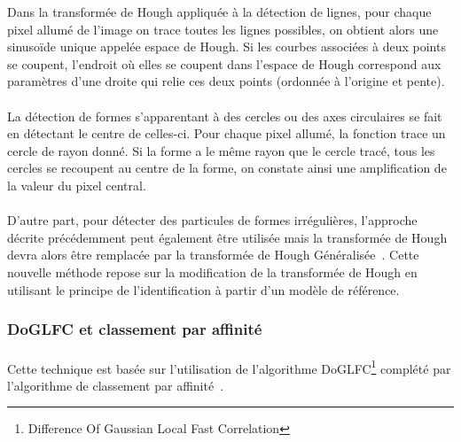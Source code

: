 \documentclass[11pt,a4paper]{report}
\begin{document}
\noindent
Dans la transformée de Hough\cite{HT:url} appliquée à la détection de lignes, pour chaque pixel allumé de l'image on trace toutes les lignes possibles, on obtient alors une sinusoïde unique appelée espace de Hough. Si les courbes associées à deux points se coupent, l'endroit où elles se coupent dans l'espace de Hough correspond aux paramètres d'une droite qui relie ces deux points (ordonnée à l'origine et pente).%

\paragraph*{}
La détection de formes s’apparentant à des cercles ou des axes circulaires se fait en détectant le centre de celles-ci.
Pour chaque pixel allumé, la fonction trace un cercle de rayon donné. Si la forme a le même rayon que le cercle tracé, tous les cercles se recoupent au centre de la forme, on constate ainsi une amplification de la valeur du pixel central.

\paragraph*{}
D'autre part, pour détecter des particules de formes irrégulières, l'approche décrite précédemment peut également \^etre utilisée mais la transformée de Hough devra alors \^etre remplacée par la transformée de Hough Généralisée~\cite{GHT:url}. 
Cette nouvelle méthode repose sur la modification de la transformée de Hough en utilisant le principe de l'identification à partir d'un modèle de référence.

\subsubsection{DoGLFC et classement par affinité}
\paragraph*{}
Cette technique est basée sur l'utilisation de l'algorithme DoGLFC\footnote{Difference Of Gaussian Local Fast Correlation} complété par l'algorithme de classement par affinité~\cite{DoGAff:article}.
\end{document}
